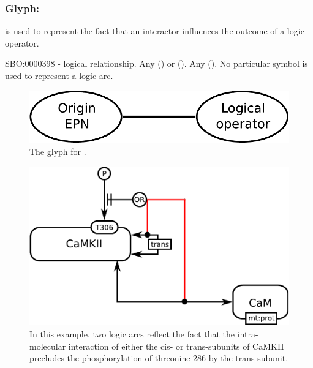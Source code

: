 \color{blue}
\subsubsection{Glyph:  }\label{sec:logicArc}

 is used to represent the fact that an interactor influences
the outcome of a logic operator. 

\begin{glyphDescription}
 \glyphSboTerm SBO:0000398 - logical relationship.
 \glyphOrigin Any  () or  ().
 \glyphTarget Any  ().
 \glyphEndPoint No particular symbol is used to represent a logic arc.
 \end{glyphDescription}

\begin{figure}[H]
  \centering
  \includegraphics[scale = 0.4]{images/logicArc}
  \caption{The \ER glyph for .}
  \label{fig:logicArc}
\end{figure}

\begin{figure}[H]
  \centering
  \includegraphics[scale = 0.5]{examples/ex-logicArc}
  \caption{In this example, two logic arcs reflect the fact that the intra-molecular interaction of either the cis- or trans-subunits of CaMKII precludes the phosphorylation of threonine 286 by the trans-subunit.}
  \label{fig:ex-logicArc}
\end{figure}

\normalcolor